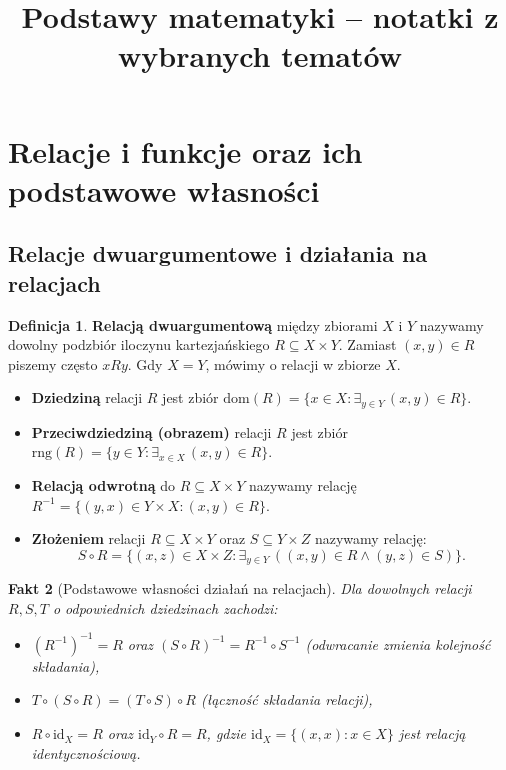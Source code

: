 \documentclass[11pt, a4paper]{article}
\title{\textbf{Podstawy matematyki} -- notatki z wybranych tematów}
\author{}
\date{}
\theoremstyle{definition}
\newtheorem{definicja}{Definicja}[section]
\theoremstyle{plain}
\newtheorem{fakt}[definicja]{Fakt}
\theoremstyle{remark}
\begin{document}
\maketitle

\tableofcontents

\newpage

\section{Relacje i funkcje oraz ich podstawowe własności}

\subsection{Relacje dwuargumentowe i działania na relacjach}

\begin{definicja}
\textbf{Relacją dwuargumentową} między zbiorami $X$ i $Y$ nazywamy dowolny podzbiór iloczynu kartezjańskiego $R \subseteq X \times Y$. Zamiast $(x, y) \in R$ piszemy często $x R y$. Gdy $X = Y$, mówimy o relacji w zbiorze $X$.
\begin{itemize}
    \item \textbf{Dziedziną} relacji $R$ jest zbiór $\mathrm{dom}(R) = \{x \in X : \exists_{y \in Y}\, (x, y) \in R\}$.
    \item \textbf{Przeciwdziedziną (obrazem)} relacji $R$ jest zbiór $\mathrm{rng}(R) = \{y \in Y : \exists_{x \in X}\, (x, y) \in R\}$.
    \item \textbf{Relacją odwrotną} do $R \subseteq X \times Y$ nazywamy relację $R^{-1} = \{(y, x) \in Y \times X : (x, y) \in R\}$.
    \item \textbf{Złożeniem} relacji $R \subseteq X \times Y$ oraz $S \subseteq Y \times Z$ nazywamy relację:
    \[
        S \circ R = \{(x, z) \in X \times Z : \exists_{y \in Y}\, ((x, y) \in R \land (y, z) \in S)\}.
    \]
\end{itemize}
\end{definicja}

\begin{fakt}[Podstawowe własności działań na relacjach]
Dla dowolnych relacji $R, S, T$ o odpowiednich dziedzinach zachodzi:
\begin{itemize}
    \item $(R^{-1})^{-1} = R$ oraz $(S \circ R)^{-1} = R^{-1} \circ S^{-1}$ (odwracanie zmienia kolejność składania),
    \item $T \circ (S \circ R) = (T \circ S) \circ R$ (łączność składania relacji),
    \item $R \circ \mathrm{id}_X = R$ oraz $\mathrm{id}_Y \circ R = R$, gdzie $\mathrm{id}_X = \{(x, x) : x \in X\}$ jest relacją identycznościową.
\end{itemize}
\end{fakt}
\end{document}
